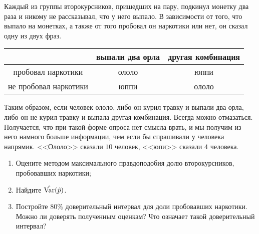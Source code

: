 \begin{problem} 
Каждый из группы второкурсников, пришедших на пару, подкинул монетку два раза и никому не рассказывал, что у него выпало. В зависимости от того, что выпало на монетках, а также от того пробовал он наркотики или нет, он сказал одну из двух фраз.
	
	\begin{center}
		\begin{tabular}{c|c|c}
		                                 &  выпали два орла   & другая комбинация   \\ \hline
пробовал наркотики      &   ололо                     &   юппи       \\ \hline
не пробовал наркотики &	  юппи	                     &   ололо      \\
		\end{tabular}
	\end{center}
	
Таким образом, если человек ололо, либо он курил травку и выпали два орла, либо он не курил травку и выпала другая комбинация. Всегда можно отмазаться. Получается, что при такой форме опроса нет смысла врать, и мы получим из него намного больше информации, чем если бы спрашивали у человека напрямик.  <<Ололо>> сказали $10$ человек, <<юпи>> сказали $4$ человека.

\begin{enumerate}
	\item  Оцените методом максимального правдоподобия долю второкурсников, пробовавших наркотики;
	\item Найдите $\hat{\operatorname{Var}}(\hat p)$. 
	\item Постройте $80\%$ доверительный интервал для доли пробовавших наркотики. Можно ли доверять полученным оценкам? Что означает такой доверительный интервал? 
\end{enumerate}
\end{problem}

